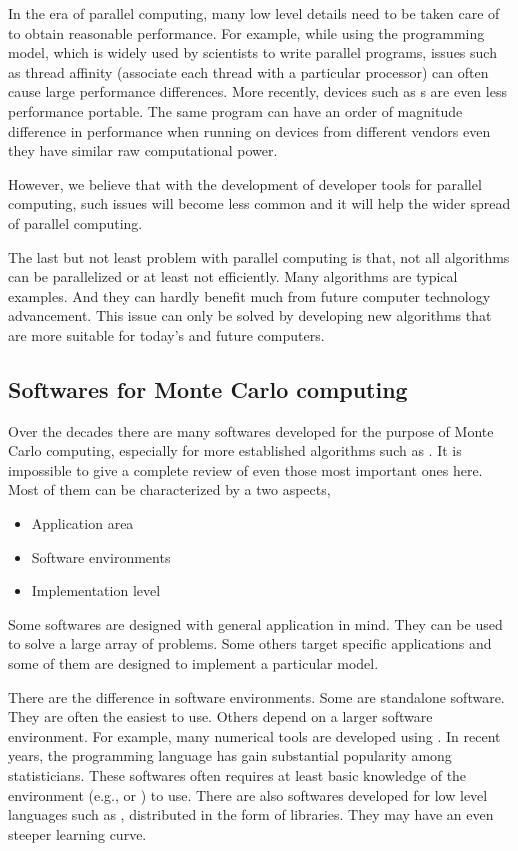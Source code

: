 In the era of parallel computing, many low level details need to be taken care
of to obtain reasonable performance. For example, while using the \openmp
programming model, which is widely used by scientists to write parallel
programs, issues such as thread affinity (associate each thread with a
particular processor) can often cause large performance differences. More
recently, devices such as \gpu{}s are even less performance portable. The same
\opencl \cite{opencl} program can have an order of magnitude difference in
performance when running on devices from different vendors even they have
similar raw computational power.

However, we believe that with the development of developer tools for parallel
computing, such issues will become less common and it will help the wider
spread of parallel computing.

The last but not least problem with parallel computing is that, not all
algorithms can be parallelized or at least not efficiently. Many \mcmc
algorithms are typical examples. And they can hardly benefit much from future
computer technology advancement. This issue can only be solved by developing
new algorithms that are more suitable for today's and future computers.

\subsection{Softwares for Monte Carlo computing}
\label{sub:Softwares for Monte Carlo computing}

Over the decades there are many softwares developed for the purpose of Monte
Carlo computing, especially for more established algorithms such as \mcmc. It
is impossible to give a complete review of even those most important ones
here. Most of them can be characterized by a two aspects,
\begin{itemize}
  \item Application area
  \item Software environments
  \item Implementation level
\end{itemize}
Some softwares are designed with general application in mind. They can be used
to solve a large array of problems. Some others target specific applications
and some of them are designed to implement a particular model.

There are the difference in software environments. Some are standalone
software. They are often the easiest to use. Others depend on a larger
software environment. For example, many numerical tools are developed using
\matlab \cite{matlab}. In recent years, the \rlang programming language
\cite{rlang} has gain substantial popularity among statisticians. These
softwares often requires at least basic knowledge of the environment (e.g.,
\matlab or \rlang) to use. There are also softwares developed for low level
languages such as \cpp, distributed in the form of libraries. They may have
an even steeper learning curve.

